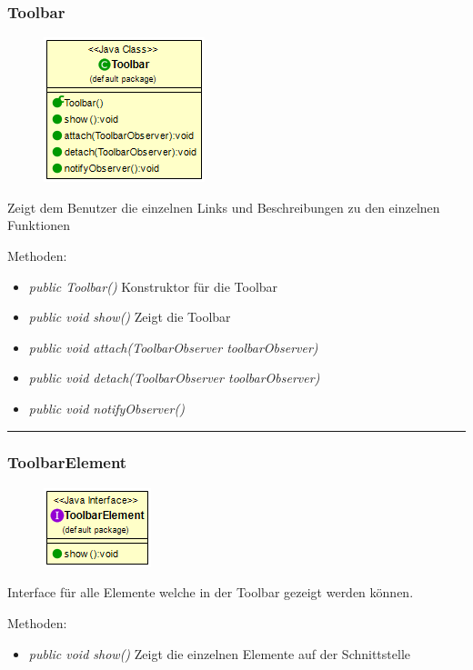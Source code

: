 \subsubsection{Toolbar}
\begin{minipage}{0.3\textwidth}
    \begin{figure}[H]
        {\centering\includegraphics[scale = 0.5
        ]{media/view/toolbar/Toolbar_Class.png}}
    \end{figure}
    \end{minipage} \hfill
    \begin{minipage}{0.6\textwidth}
Zeigt dem Benutzer die einzelnen Links und Beschreibungen zu den einzelnen Funktionen
\end{minipage}
\vspace{\baselineskip}
Methoden: \begin{itemize} [noitemsep]
    \item \emph{public Toolbar()} Konstruktor für die Toolbar
    \item \emph{public void show()} Zeigt die Toolbar
    \item \emph{public void attach(ToolbarObserver toolbarObserver)}
    \item \emph{public void detach(ToolbarObserver toolbarObserver)}
    \item \emph{public void notifyObserver()}
\end{itemize}

\rule{\textwidth}{0.4pt}
\subsubsection{ToolbarElement}
\begin{minipage}{0.3\textwidth}
    \begin{figure}[H]
        {\centering\includegraphics[scale = 0.7
        ]{media/view/toolbar/ToolbarElement.png}}
    \end{figure}
    \end{minipage} \hfill
    \begin{minipage}{0.6\textwidth}
Interface für alle Elemente welche in der Toolbar gezeigt werden können.
\end{minipage}
\vspace{\baselineskip}
Methoden: \begin{itemize} [noitemsep]
    \item \emph{public void show()} Zeigt die einzelnen Elemente auf der Schnittstelle
\end{itemize}

